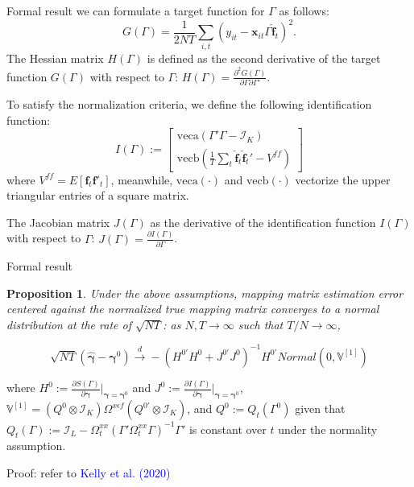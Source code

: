 \documentclass{beamer}
\newtheorem{proposition}{Proposition}
\begin{document}
\begin{frame}{Formal result}
we can formulate a target function for $\Gamma$ as follows:
\begin{equation*}
\label{eqn: target}
G(\Gamma) = \frac{1}{2NT}\sum_{i,t} \left( y_{it} - \boldsymbol{x}_{it}\Gamma \boldsymbol{\hat{f}}_t \right)^2.
\end{equation*}
The Hessian matrix $H(\Gamma)$ is defined as the second derivative of the target function $G(\Gamma)$ with respect to $\Gamma$: $H(\Gamma) = \frac{\partial^2 G(\Gamma)}{\partial \Gamma \partial \Gamma'}$. 

To satisfy the normalization criteria, we define the following identification function:
\begin{equation*}
\label{eqn: identification}
I(\Gamma) := \begin{bmatrix}
    \text{veca}(\Gamma' \Gamma - \mathcal{I}_K) \\
    \text{vecb}\left(\frac{1}{T} \sum_{t} \boldsymbol{\hat{f}}_t\boldsymbol{\hat{f}}_t' - V^{ff}\right)
    \end{bmatrix}
\end{equation*}
where $V^{ff} = E\left[\boldsymbol{f}_t\boldsymbol{f}'_t\right]$, meanwhile, $\text{veca}(\cdot)$ and $\text{vecb}(\cdot)$ vectorize the upper triangular entries of a square matrix.

The Jacobian matrix $J(\Gamma)$ as the derivative of the identification function $I(\Gamma)$ with respect to $\Gamma$: $J(\Gamma) = \frac{\partial I(\Gamma)}{\partial \Gamma}$.
\end{frame}

\begin{frame}{Formal result}
\begin{proposition}
\label{prop: gamma}
Under the above assumptions, mapping matrix estimation error centered against the normalized true mapping matrix converges to a normal distribution at the rate of $\sqrt{NT}$: as $N, T \rightarrow \infty$ such that $T/N \rightarrow \infty$,

$$
\sqrt{NT} \left( \hat{\boldsymbol{\gamma}} - \boldsymbol{\gamma}^0 \right) \xrightarrow{d} - \left( H^{0'}H^0 + J^{0'}J^0 \right)^{-1}H^{0'}Normal(0, \mathbb{V}^{[1]})
$$
\end{proposition}
where $H^0:= \frac{\partial S(\Gamma)}{\partial \boldsymbol{\gamma}}|_{\boldsymbol{\gamma} = \boldsymbol{\gamma}^0}$ and $J^0:= \frac{\partial I(\Gamma)}{\partial \boldsymbol{\gamma}}|_{\boldsymbol{\gamma} = \boldsymbol{\gamma}^0}$, $\mathbb{V}^{[1]} = \left( Q^0 \otimes \mathcal{I}_K \right) \Omega^{x\epsilon f} \left( Q^{0'} \otimes \mathcal{I}_K \right)$, and $Q^0 := Q_t(\Gamma^0)$ given that $Q_t(\Gamma) := \mathcal{I}_L - \Omega_t^{xx} \left( \Gamma' \Omega^{xx}_t \Gamma \right)^{-1}\Gamma'$ is constant over $t$ under the normality assumption.

Proof: refer to \textcolor{blue}{Kelly et al. (2020)}
\end{frame}
\end{document}
